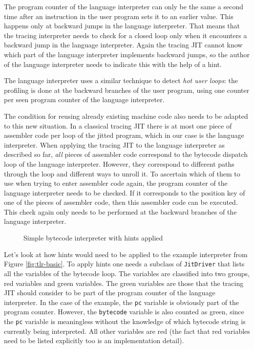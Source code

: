 \documentclass{sig-alternate}
\begin{document}
The program counter of the language interpreter can only be the same a
second time after an instruction in the user program sets it to an earlier
value. This happens only at backward jumps in the language interpreter. That
means that the tracing interpreter needs to check for a closed loop only when it
encounters a backward jump in the language interpreter. Again the tracing JIT
cannot know which part of the language interpreter implements backward jumps,
so the author of the language interpreter needs to indicate this with the help
of a hint.

The language interpreter uses a similar technique to detect \emph{hot user
loops}: the profiling is done at the backward branches of the user program,
using one counter per seen program counter of the language interpreter.

The condition for reusing already existing machine code also needs to be adapted to
this new situation. In a classical tracing JIT there is at most one piece of
assembler code per loop of the jitted program, which in our case is the language
interpreter. When applying the tracing JIT to the language interpreter as
described so far, \emph{all} pieces of assembler code correspond to the bytecode
dispatch loop of the language interpreter. However, they correspond to different
paths through the loop and different ways to unroll it. To ascertain which of them to use
when trying to enter assembler code again, the program counter of the language
interpreter needs to be checked. If it corresponds to the position key of one of
the pieces of assembler code, then this assembler code can be executed. This
check again only needs to be performed at the backward branches of the language
interpreter.

\begin{figure}

\caption{Simple bytecode interpreter with hints applied}
\label{fig:tlr-full}
\end{figure}

Let's look at how hints would need to be applied to the example interpreter
from Figure \ref{fig:tlr-basic}. To apply hints one needs a
subclass of \texttt{JitDriver} that lists all the variables of the bytecode
loop. The variables are classified into two groups, red variables and green
variables. The green variables are those that the tracing JIT should consider to
be part of the program counter of the language interpreter. In the case of the
example, the \texttt{pc} variable is obviously part of the program counter.
However, the \texttt{bytecode} variable is also counted as green, since the
\texttt{pc} variable is meaningless without the knowledge of which bytecode
string is currently being interpreted. All other variables are red (the fact
that red variables need to be listed explicitly too is an implementation
detail).
\end{document}
